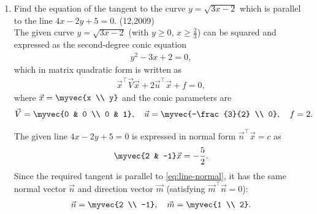 \begin{enumerate}[label=\thesubsection.\arabic*, ref=\thesubsection.\theenumi]
  The general solution for $x$ ,
  \begin{align}
  	x = n\pi + \frac{\pi}{4}, \quad n \in \mathbb{Z}
  \end{align}
    \begin{lstlisting}
  	/codes/q12.py
  \end{lstlisting}
  \item Find the equation of the tangent to the curve $y = \sqrt{3x - 2}$ which is parallel to the line $4x - 2y + 5 = 0$. \hfill{(12,2009)}\\
  \solution
  The given curve $y = \sqrt{3x - 2}$ (with $y \ge 0$, $x \ge \frac{2}{3}$) can be squared and expressed as the second-degree conic equation
  \begin{align}
  	y^2 - 3x + 2 = 0, \label{eq:conic-eq}
  \end{align}
  which in matrix quadratic form is written as
  \begin{align}
  	\vec{x}^{\top}\vec{V}\vec{x} + 2\vec{u}^{\top}\vec{x} + f = 0, \label{eq:conic-matrix}
  \end{align}
  where $\vec{x} = \myvec{x \\ y}$ and the conic parameters are
  \begin{align}
  	\vec{V} = \myvec{0 & 0 \\ 0 & 1}, \quad
  	\vec{u} = \myvec{-\frac{3}{2} \\ 0}, \quad
  	f = 2. \label{eq:conic-params}
  \end{align}
  
  The given line $4x - 2y + 5 = 0$ is expressed in normal form $\vec{n}^{\top}\vec{x} = c$ as
  \begin{align}
  	\myvec{2 & -1}\vec{x} = -\frac{5}{2}. \label{eq:line-normal}
  \end{align}
  Since the required tangent is parallel to \eqref{eq:line-normal}, it has the same normal vector $\vec{n}$ and direction vector $\vec{m}$ (satisfying $\vec{m}^{\top}\vec{n} = 0$):
  \begin{align}
  	\vec{n} = \myvec{2 \\ -1}, \quad
  	\vec{m} = \myvec{1 \\ 2}. \label{eq:line-vecs}
  \end{align}
  

\end{enumerate}
